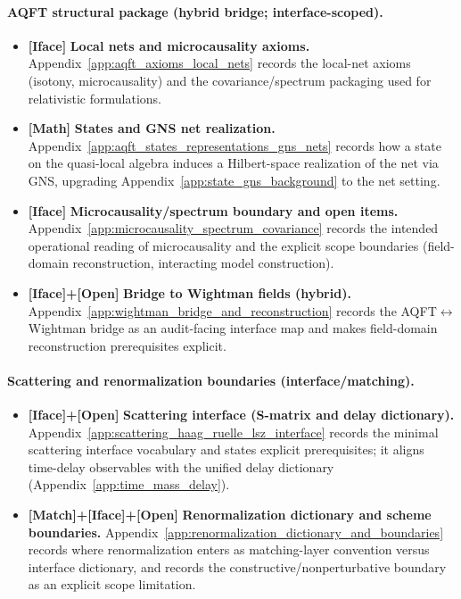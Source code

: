 \paragraph{AQFT structural package (hybrid bridge; interface-scoped).}
\begin{itemize}
\item \textbf{[Iface]} \textbf{Local nets and microcausality axioms.}
Appendix~\ref{app:aqft_axioms_local_nets} records the local-net axioms (isotony, microcausality) and the covariance/spectrum packaging used for relativistic formulations.
\item \textbf{[Math]} \textbf{States and GNS net realization.}
Appendix~\ref{app:aqft_states_representations_gns_nets} records how a state on the quasi-local algebra induces a Hilbert-space realization of the net via GNS, upgrading Appendix~\ref{app:state_gns_background} to the net setting.
\item \textbf{[Iface]} \textbf{Microcausality/spectrum boundary and open items.}
Appendix~\ref{app:microcausality_spectrum_covariance} records the intended operational reading of microcausality and the explicit scope boundaries (field-domain reconstruction, interacting model construction).
\item \textbf{[Iface]+[Open]} \textbf{Bridge to Wightman fields (hybrid).}
Appendix~\ref{app:wightman_bridge_and_reconstruction} records the AQFT$\leftrightarrow$Wightman bridge as an audit-facing interface map and makes field-domain reconstruction prerequisites explicit.
\end{itemize}

\paragraph{Scattering and renormalization boundaries (interface/matching).}
\begin{itemize}
\item \textbf{[Iface]+[Open]} \textbf{Scattering interface (S-matrix and delay dictionary).}
Appendix~\ref{app:scattering_haag_ruelle_lsz_interface} records the minimal scattering interface vocabulary and states explicit prerequisites; it aligns time-delay observables with the unified delay dictionary (Appendix~\ref{app:time_mass_delay}).
\item \textbf{[Match]+[Iface]+[Open]} \textbf{Renormalization dictionary and scheme boundaries.}
Appendix~\ref{app:renormalization_dictionary_and_boundaries} records where renormalization enters as matching-layer convention versus interface dictionary, and records the constructive/nonperturbative boundary as an explicit scope limitation.
\end{itemize}

